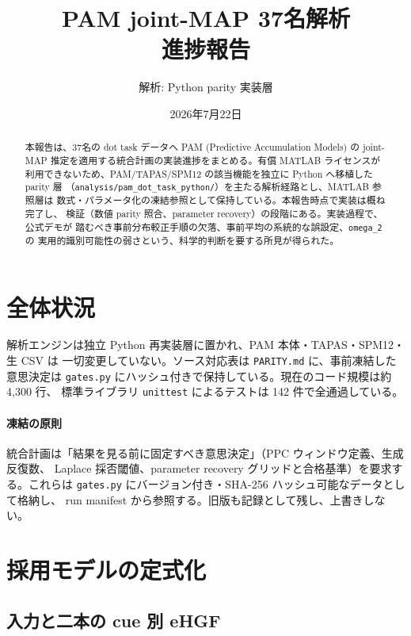 \documentclass[11pt]{ltjsarticle}
\title{PAM joint-MAP 37名解析\\進捗報告}
\author{解析: Python parity 実装層}
\date{2026年7月22日}
\newcommand{\code}[1]{\texttt{#1}}
\begin{document}
\maketitle

\begin{abstract}
本報告は、37名の dot task データへ PAM (Predictive Accumulation Models) の
joint-MAP 推定を適用する統合計画の実装進捗をまとめる。有償 MATLAB ライセンスが
利用できないため、PAM/TAPAS/SPM12 の該当機能を独立に Python へ移植した parity 層
（\code{analysis/pam\_dot\_task\_python/}）を主たる解析経路とし、MATLAB 参照層は
数式・パラメータ化の凍結参照として保持している。本報告時点で実装は概ね完了し、
検証（数値 parity 照合、parameter recovery）の段階にある。実装過程で、公式デモが
踏むべき事前分布較正手順の欠落、事前平均の系統的な誤設定、\code{omega\_2} の
実用的識別可能性の弱さという、科学的判断を要する所見が得られた。
\end{abstract}

\tableofcontents

\section{全体状況}

解析エンジンは独立 Python 再実装層に置かれ、PAM 本体・TAPAS・SPM12・生 CSV は
一切変更していない。ソース対応表は \code{PARITY.md} に、事前凍結した意思決定は
\code{gates.py} にハッシュ付きで保持している。現在のコード規模は約 4{,}300 行、
標準ライブラリ \code{unittest} によるテストは 142 件で全通過している。

\paragraph{凍結の原則}
統合計画は「結果を見る前に固定すべき意思決定」（PPC ウィンドウ定義、生成反復数、
Laplace 採否閾値、parameter recovery グリッドと合格基準）を要求する。これらは
\code{gates.py} にバージョン付き・SHA-256 ハッシュ可能なデータとして格納し、
run manifest から参照する。旧版も記録として残し、上書きしない。

\section{採用モデルの定式化}
\label{sec:formulation}

\subsection{入力と二本の cue 別 eHGF}
\end{document}
